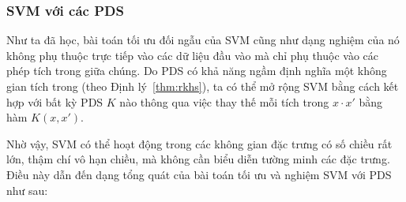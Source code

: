 \subsubsection{SVM với các \protect{} PDS}

Như ta đã học, bài toán tối ưu đối ngẫu của SVM cũng như dạng nghiệm
của nó không phụ thuộc trực tiếp vào các  dữ liệu đầu vào
mà chỉ phụ thuộc vào các phép tích trong giữa chúng.
Do \protect{} PDS có khả năng ngầm định nghĩa một không gian
tích trong (theo Định lý~\ref{thm:rkhs}), ta có thể mở rộng SVM bằng
cách kết hợp với bất kỳ \protect{} PDS $K$ nào thông qua việc
thay thế mỗi tích trong $x \cdot x'$ bằng hàm \protect{}
$K(x,x')$.

Nhờ vậy, SVM có thể hoạt động trong các không gian đặc trưng có số
chiều rất lớn, thậm chí vô hạn chiều, mà không cần biểu diễn tường
minh các  đặc trưng. Điều này dẫn đến dạng tổng quát của
bài toán tối ưu và nghiệm SVM với \protect{} PDS như sau:


